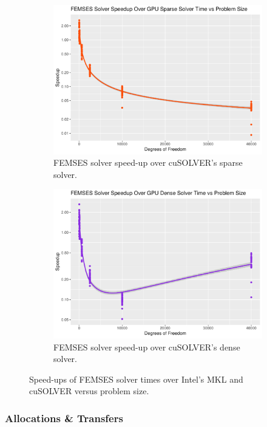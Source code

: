 \begin{figure}
\begin{subfigure}{0.48\linewidth}
		\centering
		\includegraphics[width=\linewidth]{Plots/solve_femses_sparse_gpu_speedup_vs_n}
		\caption{FEMSES solver speed-up over cuSOLVER's sparse solver.}
		\label{fig:solve_femses_gpu_sparse}
	\end{subfigure}\hfill
	\begin{subfigure}{0.48\linewidth}
		\centering
		\includegraphics[width=\linewidth]{Plots/solve_femses_dense_gpu_speedup_vs_n}
		\caption{FEMSES solver speed-up over cuSOLVER's dense solver.}
		\label{fig:solve_femses_gpu_dense}
	\end{subfigure}
	\caption{Speed-ups of FEMSES solver times over Intel's MKL and cuSOLVER versus problem size.}
	\label{fig:solve_femses}
\end{figure}

\subsubsection{Allocations \& Transfers}

